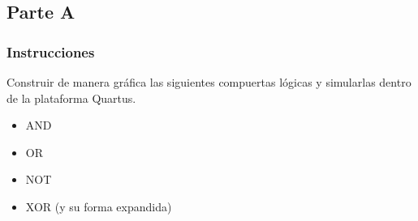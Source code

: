 \documentclass[../procedimientos.tex]{subfiles}
\begin{document}
\clearpage
\subsection{Parte A}
\subsubsection{Instrucciones}
\begin{em}
  Construir de manera gráfica las siguientes compuertas lógicas y simularlas 
  dentro de la plataforma Quartus.
  \begin{itemize}
      \item AND
      \item OR
      \item NOT
      \item XOR (y su forma expandida)
  \end{itemize}
\end{em}
\end{document}
